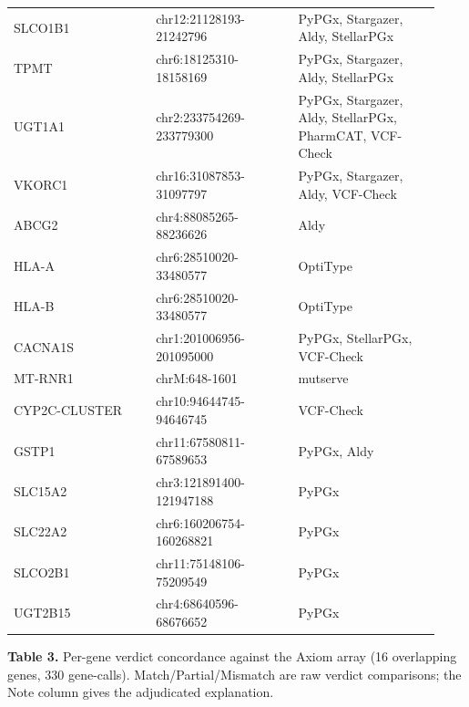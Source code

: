 \documentclass[11pt]{article}
\begin{document}
\begin{longtable}{p{0.31\linewidth}p{0.31\linewidth}p{0.31\linewidth}}
SLCO1B1 & chr12:21128193-21242796 & PyPGx, Stargazer, Aldy, StellarPGx \\
TPMT & chr6:18125310-18158169 & PyPGx, Stargazer, Aldy, StellarPGx \\
UGT1A1 & chr2:233754269-233779300 & PyPGx, Stargazer, Aldy, StellarPGx, PharmCAT, VCF-Check \\
VKORC1 & chr16:31087853-31097797 & PyPGx, Stargazer, Aldy, VCF-Check \\
ABCG2 & chr4:88085265-88236626 & Aldy \\
HLA-A & chr6:28510020-33480577 & OptiType \\
HLA-B & chr6:28510020-33480577 & OptiType \\
CACNA1S & chr1:201006956-201095000 & PyPGx, StellarPGx, VCF-Check \\
MT-RNR1 & chrM:648-1601 & mutserve \\
CYP2C-CLUSTER & chr10:94644745-94646745 & VCF-Check \\
GSTP1 & chr11:67580811-67589653 & PyPGx, Aldy \\
SLC15A2 & chr3:121891400-121947188 & PyPGx \\
SLC22A2 & chr6:160206754-160268821 & PyPGx \\
SLCO2B1 & chr11:75148106-75209549 & PyPGx \\
UGT2B15 & chr4:68640596-68676652 & PyPGx \\
\hline
\end{longtable}

\textbf{Table 3.} Per-gene verdict concordance against the Axiom array (16 overlapping genes, 330 gene-calls). Match/Partial/Mismatch are raw verdict comparisons; the Note column gives the adjudicated explanation.
\end{document}
